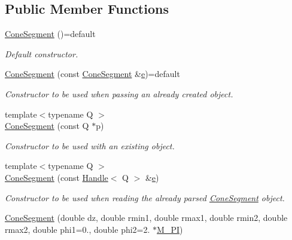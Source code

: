 \subsection*{Public Member Functions}
\begin{DoxyCompactItemize}
\item 
\hyperlink{class_d_d4hep_1_1_geometry_1_1_cone_segment_a9316a5df29fa22456f3fccdb8faeb71d}{Cone\+Segment} ()=default
\begin{DoxyCompactList}\small\item\em Default constructor. \end{DoxyCompactList}\item 
\hyperlink{class_d_d4hep_1_1_geometry_1_1_cone_segment_ad2383b0a23c1154eee9a86202342c5ac}{Cone\+Segment} (const \hyperlink{class_d_d4hep_1_1_geometry_1_1_cone_segment}{Cone\+Segment} \&\hyperlink{_volumes_8cpp_a8a9a1f93e9b09afccaec215310e64142}{e})=default
\begin{DoxyCompactList}\small\item\em Constructor to be used when passing an already created object. \end{DoxyCompactList}\item 
{\footnotesize template$<$typename Q $>$ }\\\hyperlink{class_d_d4hep_1_1_geometry_1_1_cone_segment_a5c757015086f6e110bb9e36a8a274e21}{Cone\+Segment} (const Q $\ast$p)
\begin{DoxyCompactList}\small\item\em Constructor to be used with an existing object. \end{DoxyCompactList}\item 
{\footnotesize template$<$typename Q $>$ }\\\hyperlink{class_d_d4hep_1_1_geometry_1_1_cone_segment_acc8610e3b6387836aafe0cf6093cbf50}{Cone\+Segment} (const \hyperlink{class_d_d4hep_1_1_handle}{Handle}$<$ Q $>$ \&\hyperlink{_volumes_8cpp_a8a9a1f93e9b09afccaec215310e64142}{e})
\begin{DoxyCompactList}\small\item\em Constructor to be used when reading the already parsed \hyperlink{class_d_d4hep_1_1_geometry_1_1_cone_segment}{Cone\+Segment} object. \end{DoxyCompactList}\item 
\hyperlink{class_d_d4hep_1_1_geometry_1_1_cone_segment_a678511761af3275a6f07099fd0b7854f}{Cone\+Segment} (double dz, double rmin1, double rmax1, double rmin2, double rmax2, double phi1=0., double phi2=2. $\ast$\hyperlink{_x_m_l_elements_8h_ae71449b1cc6e6250b91f539153a7a0d3}{M\+\_\+\+PI})

\end{DoxyCompactItemize}

